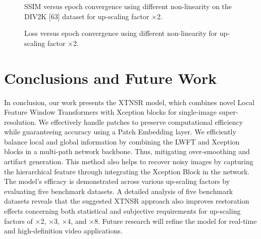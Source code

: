 \documentclass[twocolumn]{svjour3}          %
\begin{document}
\begin{figure}
    \centering
    \caption{SSIM versus epoch convergence using different non-linearity on the DIV2K [63] dataset for up-scaling factor ×2.}
    \label{fig:27}
\end{figure}

\begin{figure}
    \centering
    \caption{Loss versus epoch convergence using different non-linearity for up-scaling factor ×2.}
    \label{fig:28}
\end{figure}


\section{Conclusions and Future Work}

In conclusion, our work presents the XTNSR model, which combines novel Local Feature Window Transformers with Xception blocks for single-image super-resolution. We effectively handle patches to preserve computational efficiency while guaranteeing accuracy using a Patch Embedding layer. We efficiently balance local and global information by combining the LWFT and Xception blocks in a multi-path network backbone. Thus, mitigating over-smoothing and artifact generation. This method also helps to recover noisy images by capturing the hierarchical feature through integrating the Xception Block in the network. The model's efficacy is demonstrated across various up-scaling factors by evaluating five benchmark datasets. A detailed analysis of five benchmark datasets reveals that the suggested XTNSR approach also improves restoration effects concerning both statistical and subjective requirements for up-scaling factors of ×2, ×3, ×4, and ×8. Future research will refine the model for real-time and high-definition video applications.
\end{document}
